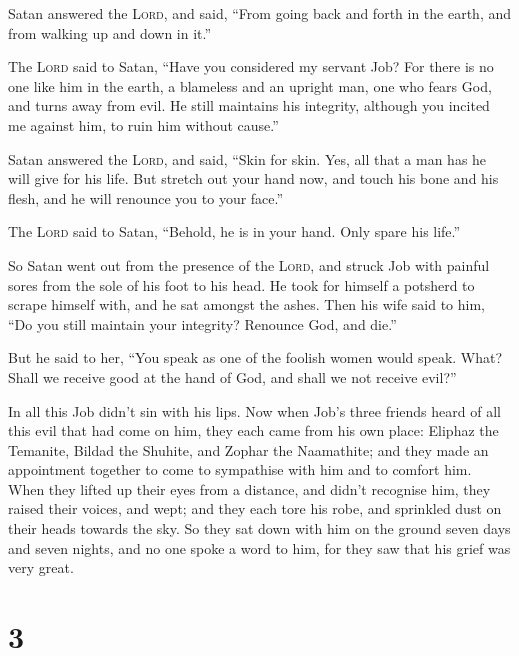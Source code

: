 Satan answered the \textsc{Lord}, and said, ``From going back and forth
in the earth, and from walking up and down in it.''

 The \textsc{Lord} said to Satan, ``Have you considered my
servant Job? For there is no one like him in the earth, a blameless and
an upright man, one who fears God, and turns away from evil. He still
maintains his integrity, although you incited me against him, to ruin
him without cause.''

 Satan answered the \textsc{Lord}, and said, ``Skin for
skin. Yes, all that a man has he will give for his life. 
But stretch out your hand now, and touch his bone and his flesh, and he
will renounce you to your face.''

 The \textsc{Lord} said to Satan, ``Behold, he is in your
hand. Only spare his life.''

 So Satan went out from the presence of the \textsc{Lord},
and struck Job with painful sores from the sole of his foot to his head.
 He took for himself a potsherd to scrape himself with,
and he sat amongst the ashes.  Then his wife said to him,
``Do you still maintain your integrity? Renounce God, and die.''

 But he said to her, ``You speak as one of the foolish
women would speak. What? Shall we receive good at the hand of God, and
shall we not receive evil?''

In all this Job didn't sin with his lips.  Now when Job's
three friends heard of all this evil that had come on him, they each
came from his own place: Eliphaz the Temanite, Bildad the Shuhite, and
Zophar the Naamathite; and they made an appointment together to come to
sympathise with him and to comfort him.  When they lifted
up their eyes from a distance, and didn't recognise him, they raised
their voices, and wept; and they each tore his robe, and sprinkled dust
on their heads towards the sky.  So they sat down with
him on the ground seven days and seven nights, and no one spoke a word
to him, for they saw that his grief was very great.

\hypertarget{section-2}{%
\section{3}\label{section-2}}

